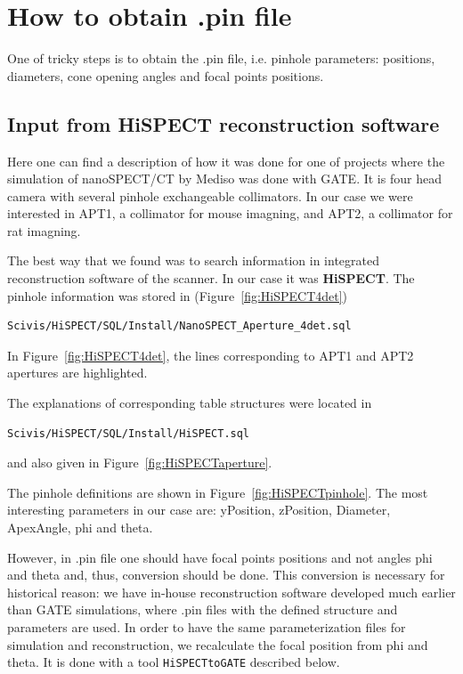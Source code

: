 \documentclass[12pt]{article}
\begin{document}
\section{How to obtain .pin file}
One of tricky steps is to obtain the .pin file, i.e. pinhole parameters: positions, diameters, cone opening angles and focal points positions. 

\subsection{Input from HiSPECT reconstruction software}
Here one can find a description of how it was done for one of projects where the simulation of nanoSPECT/CT by Mediso was done with GATE. It is four head camera with several pinhole exchangeable collimators. In our case we were interested in APT1, a collimator for mouse imagning, and APT2, a collimator for rat imagning. 

The best way that we found was to search information in integrated reconstruction software of the scanner. In our case it was \textbf{HiSPECT}.
The pinhole information was stored in (Figure~\ref{fig:HiSPECT4det})
\begin{verbatim}
Scivis/HiSPECT/SQL/Install/NanoSPECT_Aperture_4det.sql
\end{verbatim}
In Figure~\ref{fig:HiSPECT4det}, the lines corresponding to APT1 and APT2 apertures are highlighted.

The explanations of corresponding table structures were located in 
\begin{verbatim}
Scivis/HiSPECT/SQL/Install/HiSPECT.sql
\end{verbatim}
and also given in Figure~\ref{fig:HiSPECTaperture}.

The pinhole definitions are shown in Figure~\ref{fig:HiSPECTpinhole}. The most interesting parameters in our case are: yPosition, zPosition, Diameter, ApexAngle, phi and theta.

However, in .pin file one should have focal points positions and not angles phi and theta and, thus, conversion should be done. This conversion is necessary for historical reason: we have in-house reconstruction software developed much earlier than GATE simulations, where .pin files with the defined structure and parameters are used. In order to have the same parameterization files for simulation and reconstruction, we recalculate the focal position from phi and theta. It is done with a tool \texttt{HiSPECTtoGATE} described below.
\end{document}
